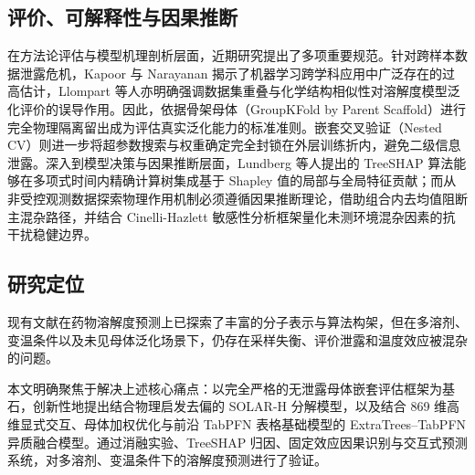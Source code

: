 \subsection{评价、可解释性与因果推断}

在方法论评估与模型机理剖析层面，近期研究提出了多项重要规范。针对跨样本数据泄露危机，Kapoor 与 Narayanan 揭示了机器学习跨学科应用中广泛存在的过高估计\cite{leakage2023}，Llompart 等人亦明确强调数据集重叠与化学结构相似性对溶解度模型泛化评价的误导作用\cite{solubility2024}。因此，依据骨架母体（GroupKFold by Parent Scaffold）进行完全物理隔离留出成为评估真实泛化能力的标准准则。嵌套交叉验证（Nested CV）则进一步将超参数搜索与权重确定完全封锁在外层训练折内，避免二级信息泄露\cite{varma2006,cawley2010}。深入到模型决策与因果推断层面，Lundberg 等人提出的 TreeSHAP 算法能够在多项式时间内精确计算树集成基于 Shapley 值的局部与全局特征贡献\cite{treeshap2020}；而从非受控观测数据探索物理作用机制必须遵循因果推断理论\cite{pearl2009}，借助组合内去均值阻断主混杂路径，并结合 Cinelli-Hazlett 敏感性分析框架量化未测环境混杂因素的抗干扰稳健边界\cite{sensitivity2020}。

\subsection{研究定位}

现有文献在药物溶解度预测上已探索了丰富的分子表示与算法构架，但在多溶剂、变温条件以及未见母体泛化场景下，仍存在采样失衡、评价泄露和温度效应被混杂的问题。

本文明确聚焦于解决上述核心痛点：以完全严格的无泄露母体嵌套评估框架为基石，创新性地提出结合物理启发去偏的 SOLAR-H 分解模型，以及结合 869 维高维显式交互、母体加权优化与前沿 TabPFN 表格基础模型的 ExtraTrees--TabPFN 异质融合模型。通过消融实验、TreeSHAP 归因、固定效应因果识别与交互式预测系统，对多溶剂、变温条件下的溶解度预测进行了验证。